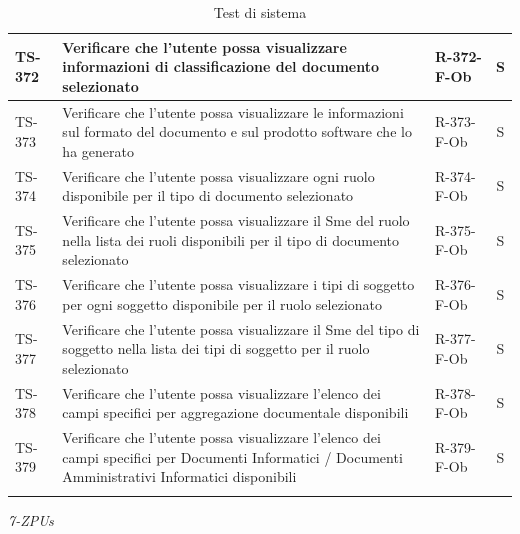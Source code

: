 \documentclass[a4paper,12pt]{article}
\begin{document}
\begin{longtable}{|p{1.5cm}|p{8.3cm}|p{2.4cm}|c|}
\hline
TS-372 & Verificare che l'utente possa visualizzare informazioni di classificazione del documento selezionato & R-372-F-Ob & S \\
\hline
TS-373 & Verificare che l'utente possa visualizzare le informazioni sul formato del documento e sul prodotto software che lo ha generato & R-373-F-Ob & S \\
\hline
TS-374 & Verificare che l'utente possa visualizzare ogni ruolo disponibile per il tipo di documento selezionato & R-374-F-Ob & S \\
\hline
TS-375 & Verificare che l'utente possa visualizzare il Sme del ruolo nella lista dei ruoli disponibili per il tipo di documento selezionato & R-375-F-Ob & S \\
\hline
TS-376 & Verificare che l'utente possa visualizzare i tipi di soggetto per ogni soggetto disponibile per il ruolo selezionato & R-376-F-Ob & S \\
\hline
TS-377 & Verificare che l'utente possa visualizzare il Sme del tipo di soggetto nella lista dei tipi di soggetto per il ruolo selezionato & R-377-F-Ob & S \\
\hline
TS-378 & Verificare che l'utente possa visualizzare l'elenco dei campi specifici per aggregazione documentale disponibili & R-378-F-Ob & S \\
\hline
TS-379 & Verificare che l'utente possa visualizzare l'elenco dei campi specifici per Documenti Informatici / Documenti Amministrativi Informatici disponibili & R-379-F-Ob & S \\
\hline
\rowcolor{white}
\caption{Test di sistema}
\label{tab:test-sistema}
\end{longtable}



\vfill

\begin{flushright}
    \textit{7-ZPUs}
\end{flushright}
\end{document}
